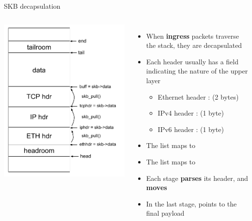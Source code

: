 \begin{frame}{SKB decapsulation}
	\begin{columns}
		\includegraphics[width=1.2\textwidth]{slides/networking-skb/skb_decapsulation.pdf}
		\begin{itemize}
			\item When \textbf{ingress} packets traverse the stack, they are decapsulated
			\item Each header usually has a field indicating the nature of the upper layer
				\begin{itemize}
					\item Ethernet header :  (2 bytes)
					\item IPv4 header :  (1 byte)
					\item IPv6 header :  (1 byte)
				\end{itemize}
			\item The  list maps  to 
			\item The  list maps  to 
			\item Each stage \textbf{parses} its header, and \textbf{moves }
			\item In the last stage,  points to the final payload
		\end{itemize}
	\end{columns}
\end{frame}

